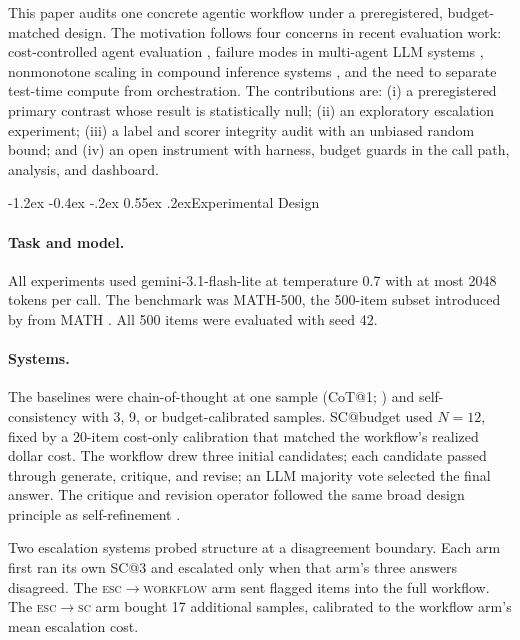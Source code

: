 \documentclass[twocolumn,10pt]{article}
\makeatletter
\renewcommand\section{\@startsection{section}{1}{\z@}%
  {-1.2ex \@plus -0.4ex \@minus -.2ex}%
  {0.55ex \@plus .2ex}{\normalfont\large\bfseries}}
\makeatother
\begin{document}
This paper audits one concrete agentic workflow under a preregistered, budget-matched design. The motivation follows four concerns in recent evaluation work: cost-controlled agent evaluation \citep{kapoor2024agents}, failure modes in multi-agent LLM systems \citep{cemri2025mast}, nonmonotone scaling in compound inference systems \citep{chen2024more}, and the need to separate test-time compute from orchestration. The contributions are: (i) a preregistered primary contrast whose result is statistically null; (ii) an exploratory escalation experiment; (iii) a label and scorer integrity audit with an unbiased random bound; and (iv) an open instrument with harness, budget guards in the call path, analysis, and dashboard.

\section{Experimental Design}
\paragraph{Task and model.}
All experiments used gemini-3.1-flash-lite at temperature 0.7 with at most 2048 tokens per call. The benchmark was MATH-500, the 500-item subset introduced by \citet{lightman2024verify} from MATH \citep{hendrycks2021math}. All 500 items were evaluated with seed 42.

\paragraph{Systems.}
The baselines were chain-of-thought at one sample (CoT@1; \citealp{wei2022cot}) and self-consistency \citep{wang2023selfconsistency} with 3, 9, or budget-calibrated samples. SC@budget used $N=12$, fixed by a 20-item cost-only calibration that matched the workflow's realized dollar cost. The workflow drew three initial candidates; each candidate passed through generate, critique, and revise; an LLM majority vote selected the final answer. The critique and revision operator followed the same broad design principle as self-refinement \citep{madaan2023selfrefine}.

Two escalation systems probed structure at a disagreement boundary. Each arm first ran its own SC@3 and escalated only when that arm's three answers disagreed. The \textsc{esc}$\to$\textsc{workflow} arm sent flagged items into the full workflow. The \textsc{esc}$\to$\textsc{sc} arm bought 17 additional samples, calibrated to the workflow arm's mean escalation cost.
\end{document}
